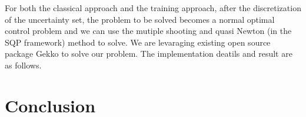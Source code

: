 \documentclass  [
  paper    = a4,
  BCOR     = 10mm,
  twoside,
  fontsize = 12pt,
  fleqn,
  toc      = bibnumbered,
  toc      = listofnumbered,
  numbers  = noendperiod,
  headings = normal,
  listof   = leveldown,
  version  = 3.03
]                                       {scrreprt}
\newcommand{\<}{\langle}
\renewcommand{\>}{\rangle}
\newcommand{\mtrx}[1]{\begin{bmatrix}#1\end{bmatrix}}
\begin{document}
For both the classical approach and the training approach, after the discretization of the uncertainty set, the problem to be solved becomes a normal optimal control problem and we can use the mutiple shooting and quasi Newton (in the SQP framework) method to solve. We are levaraging existing open source package Gekko to solve our problem. The implementation deatils and result are as follows.  

\chapter{Conclusion}
\label{Chapter5}

 
 
 
 
 
 
\end{document}
